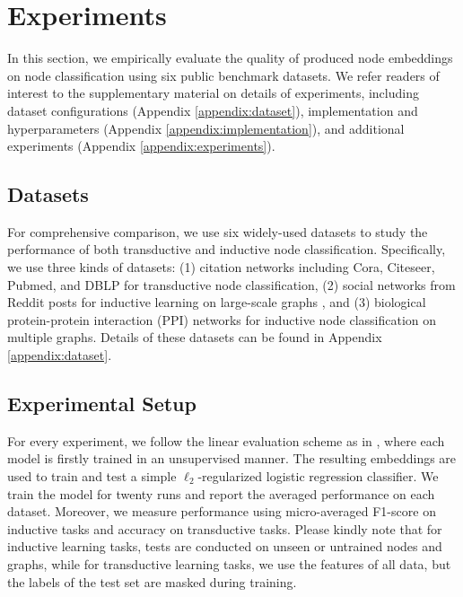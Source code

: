 \documentclass{article}
\theoremstyle{remark}
\begin{document}
 \section{Experiments}

In this section, we empirically evaluate the quality of produced node embeddings on node classification using six public benchmark datasets.
We refer readers of interest to the supplementary material on details of experiments, including dataset configurations (Appendix \ref{appendix:dataset}), implementation and hyperparameters (Appendix \ref{appendix:implementation}), and additional experiments (Appendix \ref{appendix:experiments}).

\subsection{Datasets}

For comprehensive comparison, we use six widely-used datasets to study the performance of both transductive and inductive node classification. Specifically, we use three kinds of datasets:
(1) citation networks including Cora, Citeseer, Pubmed, and DBLP \cite{Sen:2008gm,Bojchevski:2018ua} for transductive node classification,
(2) social networks from Reddit posts for inductive learning on large-scale graphs \cite{Hamilton:2017tp},
and (3) biological protein-protein interaction (PPI) networks \cite{Zitnik:2017uz} for inductive node classification on multiple graphs.
Details of these datasets can be found in Appendix \ref{appendix:dataset}.

\subsection{Experimental Setup}

For every experiment, we follow the linear evaluation scheme as in \cite{Velickovic:2019tu}, where each model is firstly trained in an unsupervised manner. The resulting embeddings are used to train and test a simple \(\ell_2\)-regularized logistic regression classifier.
We train the model for twenty runs and report the averaged performance on each dataset. Moreover, we measure performance using micro-averaged F1-score on inductive tasks and accuracy on transductive tasks.
Please kindly note that for inductive learning tasks, tests are conducted on unseen or untrained nodes and graphs, while for transductive learning tasks, we use the features of all data, but the labels of the test set are masked during training.
\end{document}
